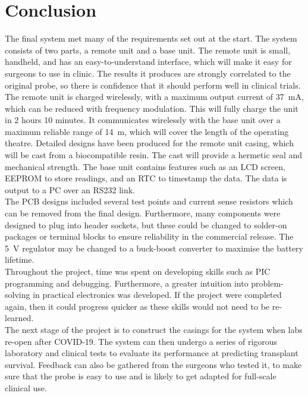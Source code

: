 \section{Conclusion}
The final system met many of the requirements set out at the start. The system consists of two parts, a remote unit and a base unit. The remote unit is small, handheld, and has an easy-to-understand interface, which will make it easy for surgeons to use in clinic. The results it produces are strongly correlated to the original probe, so there is confidence that it should perform well in clinical trials. The remote unit is charged wirelessly, with a maximum output current of \SI{37}{\milli\ampere}, which can be reduced with frequency modulation. This will fully charge the unit in 2 hours 10 minutes. It communicates wirelessly with the base unit over a maximum reliable range of \SI{14}{\metre}, which will cover the length of the operating theatre. Detailed designs have been produced for the remote unit casing, which will be cast from a biocompatible resin. The cast will provide a hermetic seal and mechanical strength. The base unit contains features such as an LCD screen, EEPROM to store readings, and an RTC to timestamp the data. The data is output to a PC over an RS232 link.\\

The PCB designs included several test points and current sense resistors which can be removed from the final design. Furthermore, many components were designed to plug into header sockets, but these could be changed to solder-on packages or terminal blocks to ensure reliability in the commercial release. The \SI{5}{\volt} regulator may be changed to a buck-boost converter to maximise the battery lifetime. \\

Throughout the project, time was spent on developing skills such as PIC programming and debugging. Furthermore, a greater intuition into problem-solving in practical electronics was developed. If the project were completed again, then it could progress quicker as these skills would not need to be re-learned. \\

The next stage of the project is to construct the casings for the system when labs re-open after COVID-19. The system can then undergo a series of rigorous laboratory and clinical tests to evaluate its performance at predicting transplant survival. Feedback can also be gathered from the surgeons who tested it, to make sure that the probe is easy to use and is likely to get adapted for full-scale clinical use.